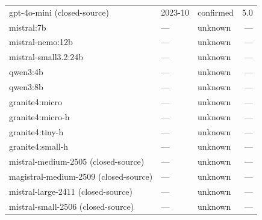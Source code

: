 \begin{table}[!htbp]
\begin{tabularx}{\linewidth}{X l l r}
gpt-4o-mini (closed-source) & 2023-10 & confirmed & 5.0 \\
mistral:7b & --- & unknown & --- \\
mistral-nemo:12b & --- & unknown & --- \\
mistral-small3.2:24b & --- & unknown & --- \\
qwen3:4b & --- & unknown & --- \\
qwen3:8b & --- & unknown & --- \\
granite4:micro & --- & unknown & --- \\
granite4:micro-h & --- & unknown & --- \\
granite4:tiny-h & --- & unknown & --- \\
granite4:small-h & --- & unknown & --- \\
mistral-medium-2505 (closed-source) & --- & unknown & --- \\
magistral-medium-2509 (closed-source) & --- & unknown & --- \\
mistral-large-2411 (closed-source) & --- & unknown & --- \\
mistral-small-2506 (closed-source) & --- & unknown & --- \\
\bottomrule
\end{tabularx}
\end{table}
